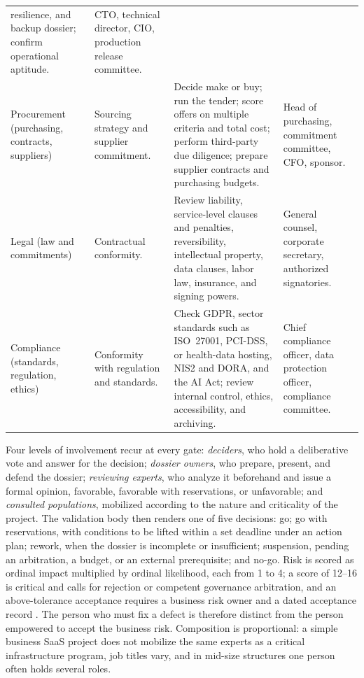 \begin{table}[!htb]
\begin{tabularx}{\linewidth}{@{}P{2.3cm}P{3.5cm}LP{2.9cm}@{}}
resilience, and backup dossier; confirm operational aptitude. & CTO, technical director, CIO,
production release committee.\\
Procurement (purchasing, contracts, suppliers) & Sourcing strategy and supplier commitment. & Decide make
or buy; run the tender; score offers on multiple criteria and total cost; perform third-party due
diligence; prepare supplier contracts and purchasing budgets. & Head of purchasing, commitment committee,
CFO, sponsor.\\
Legal (law and commitments) & Contractual conformity. & Review liability, service-level clauses and
penalties, reversibility, intellectual property, data clauses, labor law, insurance, and signing powers.
& General counsel, corporate secretary, authorized signatories.\\
Compliance (standards, regulation, ethics) & Conformity with regulation and standards. & Check GDPR,
sector standards such as ISO~27001, PCI-DSS, or health-data hosting, NIS2 and DORA, and the AI Act; review
internal control, ethics, accessibility, and archiving. & Chief compliance officer, data protection
officer, compliance committee.\\
\bottomrule
\end{tabularx}
\end{table}

Four levels of involvement recur at every gate: \emph{deciders}, who hold a deliberative vote and answer
for the decision; \emph{dossier owners}, who prepare, present, and defend the dossier; \emph{reviewing
experts}, who analyze it beforehand and issue a formal opinion, favorable, favorable with reservations,
or unfavorable; and \emph{consulted populations}, mobilized according to the nature and criticality of
the project. The validation body then renders one of five decisions: go; go with reservations, with
conditions to be lifted within a set deadline under an action plan; rework, when the dossier is
incomplete or insufficient; suspension, pending an arbitration, a budget, or an external prerequisite;
and no-go. Risk is scored as ordinal impact multiplied by ordinal likelihood, each from 1 to 4; a score
of 12--16 is critical and calls for rejection or competent governance arbitration, and an
above-tolerance acceptance requires a business risk owner and a dated acceptance record
\citep[pp.~38, 98, 100--101]{canale2026}. The person who must fix a defect is therefore distinct from the
person empowered to accept the business risk. Composition is proportional: a simple business SaaS
project does not mobilize the same experts as a critical infrastructure program, job titles vary, and in
mid-size structures one person often holds several roles.

